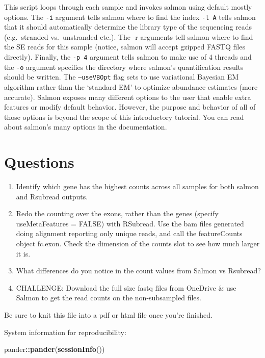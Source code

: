\documentclass[
]{book}
\newenvironment{Shaded}{\begin{snugshade}}{\end{snugshade}}
\newcommand{\FunctionTok}[1]{\textcolor[rgb]{0.13,0.29,0.53}{\textbf{#1}}}
\newcommand{\NormalTok}[1]{#1}
\newcommand{\SpecialCharTok}[1]{\textcolor[rgb]{0.81,0.36,0.00}{\textbf{#1}}}
\begin{document}
This script loops through each sample and invokes salmon using default mostly options. The \texttt{-i} argument tells salmon where to find the index \texttt{-l\ A} tells salmon that it should automatically determine the library type of the sequencing reads (e.g.~stranded vs.~unstranded etc.). The -r arguments tell salmon where to find the SE reads for this sample (notice, salmon will accept gzipped FASTQ files directly). Finally, the \texttt{-p\ 4} argument tells salmon to make use of 4 threads and the \texttt{-o} argument specifies the directory where salmon's quantification results should be written. The \texttt{–useVBOpt} flag sets to use variational Bayesian EM algorithm rather than the `standard EM' to optimize abundance estimates (more accurate). Salmon exposes many different options to the user that enable extra features or modify default behavior. However, the purpose and behavior of all of those options is beyond the scope of this introductory tutorial. You can read about salmon's many options in the documentation.

\hypertarget{questions-2}{%
\section{Questions}\label{questions-2}}

\begin{enumerate}
\def\labelenumi{\arabic{enumi}.}
\item
  Identify which gene has the highest counts across all samples for both salmon and Rsubread outputs.
\item
  Redo the counting over the exons, rather than the genes (specify useMetaFeatures = FALSE) with RSubread. Use the bam files generated doing alignment reporting only unique reads, and call the featureCounts object fc.exon. Check the dimension of the counts slot to see how much larger it is.
\item
  What differences do you notice in the count values from Salmon vs Rsubread?
\item
  CHALLENGE: Download the full size fastq files from OneDrive \& use Salmon to get the read counts on the non-subsampled files.
\end{enumerate}

Be sure to knit this file into a pdf or html file once you're finished.

System information for reproducibility:

\begin{Shaded}
\begin{Highlighting}[]
\NormalTok{pander}\SpecialCharTok{::}\FunctionTok{pander}\NormalTok{(}\FunctionTok{sessionInfo}\NormalTok{())}
\end{Highlighting}
\end{Shaded}
\end{document}
